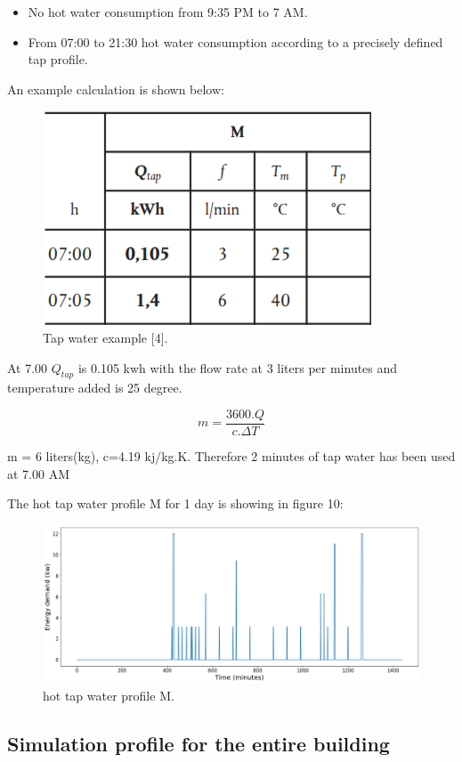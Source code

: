 \documentclass[a4paper,10pt]{article}
\begin{document}
\begin{itemize}
      \item No hot water consumption from 9:35 PM to 7 AM.
      \item From 07:00 to 21:30 hot water consumption according to a precisely defined tap profile.
    \end{itemize}
An example calculation is shown below: 

\begin{figure}[H]
\centering
\includegraphics[width=0.6\columnwidth]{pictures/Tap_water example.png}
\caption[Short title]{Tap water example [4].}
\label{fig:ff7}\end{figure}
At 7.00 $Q_{tap}$ is 0.105 kwh with the flow rate at 3 liters  per minutes and temperature added is 25 degree.

\[m = \frac{3600.Q}{c.\Delta T}\]

m = 6 liters(kg), c=4.19 kj/kg.K. Therefore 2 minutes of tap water has been used at 7.00 AM

The hot tap water profile M for 1 day is showing in figure 10:

\begin{figure}[H]
\centering
\includegraphics[width=1\columnwidth]{pictures/hot_tap_water_profile_M.png}
\caption[Short title]{hot tap water profile M.}
\label{fig:ff8}\end{figure}

\subsection{Simulation profile for the entire building}
\end{document}
